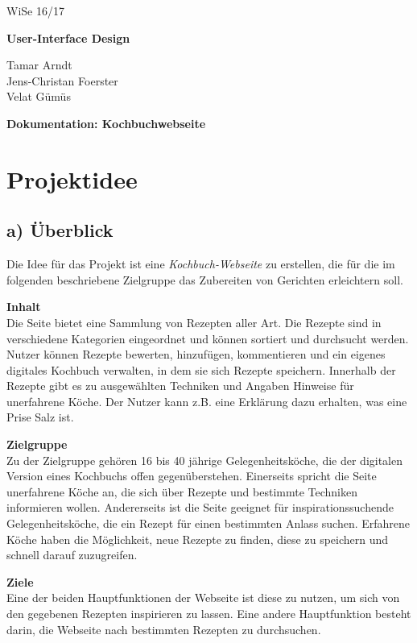 \documentclass[parskip,10pt,abstracton]{scrartcl}
\renewcommand*{\maketitle}{%
	\begin{flushright}
	{\rmfamily WiSe 16/17 \par}
	\end{flushright}
	\vspace{-1.3cm}
	
	{\bfseries\sffamily User-Interface Design} \\
	{\rmfamily Tamar Arndt \\ Jens-Christan Foerster \\ Velat Gümüs \par}
	
	{\centering\LARGE\sffamily\bfseries Dokumentation: Kochbuchwebseite \par}
	\vspace{3em}
}
\begin{document}
\maketitle
\thispagestyle{empty}

\tableofcontents
\pagebreak
\setcounter{page}{1}
\section{Projektidee}

\subsection*{a) Überblick}

Die Idee für das Projekt ist eine \textit{Kochbuch-Webseite} zu erstellen, die für die im folgenden beschriebene Zielgruppe das Zubereiten von Gerichten erleichtern soll.

\textbf{Inhalt}\\
Die Seite bietet eine Sammlung von Rezepten aller Art.
Die Rezepte sind in verschiedene Kategorien eingeordnet und können sortiert und durchsucht werden.
Nutzer können Rezepte bewerten, hinzufügen, kommentieren und ein eigenes digitales Kochbuch verwalten, in dem sie sich Rezepte speichern.
Innerhalb der Rezepte gibt es zu ausgewählten Techniken und Angaben Hinweise für unerfahrene Köche. Der Nutzer kann z.B. eine Erklärung dazu erhalten, was eine Prise Salz ist.

\textbf{Zielgruppe}\\
Zu der Zielgruppe gehören 16 bis 40 jährige Gelegenheitsköche, die der digitalen Version eines Kochbuchs offen gegenüberstehen.
Einerseits spricht die Seite unerfahrene Köche an, die sich über Rezepte und bestimmte Techniken informieren wollen. Andererseits ist die Seite geeignet für inspirationssuchende Gelegenheitsköche, die ein Rezept für einen bestimmten Anlass suchen. Erfahrene Köche haben die Möglichkeit, neue Rezepte zu finden, diese zu speichern und schnell darauf zuzugreifen. 

\textbf{Ziele} \\
Eine der beiden Hauptfunktionen der Webseite ist diese zu nutzen, um sich von den gegebenen Rezepten inspirieren zu lassen. Eine andere Hauptfunktion besteht darin, die Webseite nach bestimmten Rezepten zu durchsuchen. 
\end{document}
